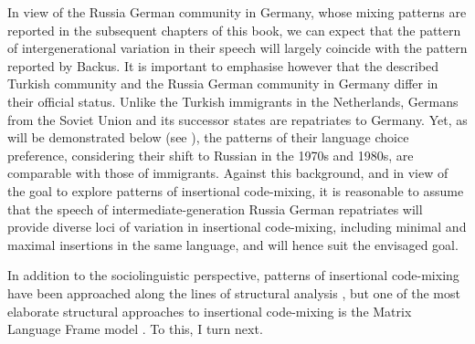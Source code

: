 In view of the Russia German community in Germany, whose mixing patterns are reported in the subsequent chapters of this book, we can expect that the pattern of intergenerational variation in their speech will largely coincide with the pattern reported by Backus. It is important to emphasise however that the described Turkish community and the Russia German community in Germany differ in their official status. Unlike the Turkish immigrants in the Netherlands, Germans from the Soviet Union and its successor states are repatriates to Germany. Yet, as will be demonstrated below (see ), the patterns of their language choice preference, considering their shift to Russian in the 1970s and 1980s, are comparable with those of immigrants. Against this background, and in view of the goal to explore patterns of insertional code-mixing, it is reasonable to assume that the speech of intermediate-generation Russia German repatriates will provide diverse loci of variation in insertional code-mixing, including minimal and maximal insertions in the same language, and will hence suit the envisaged goal.

\begin{sloppypar}
In addition to the sociolinguistic perspective, patterns of insertional code-mixing have been approached along the lines of structural analysis \citep[e.g.,][]{halmari-government-1997,boumans-syntax-1998,verschik08}, but one of the most elaborate structural approaches to insertional code-mixing is the Matrix Language Frame model \citep[cf.][363]{muysken-code-switching-1997}. To this, I turn next.
\end{sloppypar}

